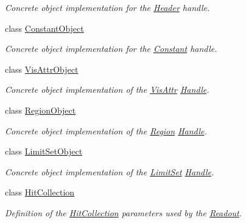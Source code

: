 \begin{DoxyCompactItemize}
\begin{DoxyCompactList}\small\item\em Concrete object implementation for the \hyperlink{class_d_d4hep_1_1_geometry_1_1_header}{Header} handle. \item\end{DoxyCompactList}\item 
class \hyperlink{class_d_d4hep_1_1_geometry_1_1_constant_object}{ConstantObject}
\begin{DoxyCompactList}\small\item\em Concrete object implementation for the \hyperlink{class_d_d4hep_1_1_geometry_1_1_constant}{Constant} handle. \item\end{DoxyCompactList}\item 
class \hyperlink{class_d_d4hep_1_1_geometry_1_1_vis_attr_object}{VisAttrObject}
\begin{DoxyCompactList}\small\item\em Concrete object implementation of the \hyperlink{class_d_d4hep_1_1_geometry_1_1_vis_attr}{VisAttr} \hyperlink{class_d_d4hep_1_1_handle}{Handle}. \item\end{DoxyCompactList}\item 
class \hyperlink{class_d_d4hep_1_1_geometry_1_1_region_object}{RegionObject}
\begin{DoxyCompactList}\small\item\em Concrete object implementation of the \hyperlink{class_d_d4hep_1_1_geometry_1_1_region}{Region} \hyperlink{class_d_d4hep_1_1_handle}{Handle}. \item\end{DoxyCompactList}\item 
class \hyperlink{class_d_d4hep_1_1_geometry_1_1_limit_set_object}{LimitSetObject}
\begin{DoxyCompactList}\small\item\em Concrete object implementation of the \hyperlink{class_d_d4hep_1_1_geometry_1_1_limit_set}{LimitSet} \hyperlink{class_d_d4hep_1_1_handle}{Handle}. \item\end{DoxyCompactList}\item 
class \hyperlink{class_d_d4hep_1_1_geometry_1_1_hit_collection}{HitCollection}
\begin{DoxyCompactList}\small\item\em Definition of the \hyperlink{class_d_d4hep_1_1_geometry_1_1_hit_collection}{HitCollection} parameters used by the \hyperlink{class_d_d4hep_1_1_geometry_1_1_readout}{Readout}. \item\end{DoxyCompactList}\item 

\end{DoxyCompactItemize}
